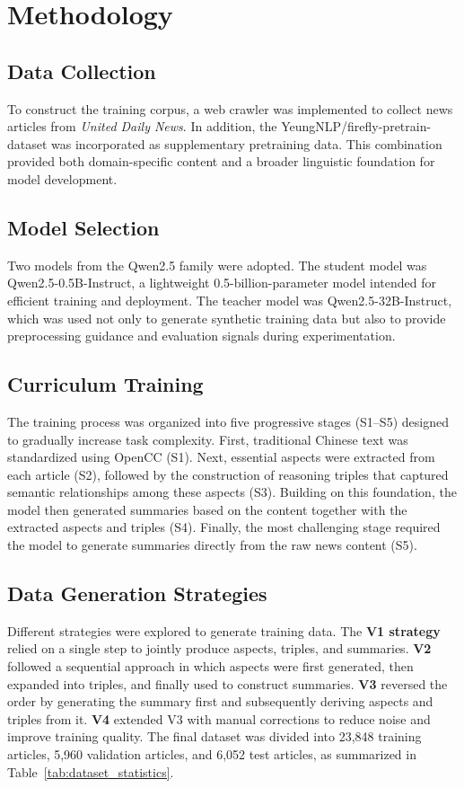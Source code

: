 
\chapter{Methodology}
\section{Data Collection}
To construct the training corpus, a web crawler was implemented to collect news articles from \textit{United Daily News}. In addition, the YeungNLP/firefly-pretrain-dataset was incorporated as supplementary pretraining data. This combination provided both domain-specific content and a broader linguistic foundation for model development.

\section{Model Selection}
Two models from the Qwen2.5 family were adopted. The student model was Qwen2.5-0.5B-Instruct, a lightweight 0.5-billion-parameter model intended for efficient training and deployment. The teacher model was Qwen2.5-32B-Instruct, which was used not only to generate synthetic training data but also to provide preprocessing guidance and evaluation signals during experimentation.

\section{Curriculum Training}
The training process was organized into five progressive stages (S1–S5) designed to gradually increase task complexity. First, traditional Chinese text was standardized using OpenCC (S1). Next, essential aspects were extracted from each article (S2), followed by the construction of reasoning triples that captured semantic relationships among these aspects (S3). Building on this foundation, the model then generated summaries based on the content together with the extracted aspects and triples (S4). Finally, the most challenging stage required the model to generate summaries directly from the raw news content (S5).

\section{Data Generation Strategies}
Different strategies were explored to generate training data. The \textbf{V1 strategy} relied on a single step to jointly produce aspects, triples, and summaries. \textbf{V2} followed a sequential approach in which aspects were first generated, then expanded into triples, and finally used to construct summaries. \textbf{V3} reversed the order by generating the summary first and subsequently deriving aspects and triples from it. \textbf{V4} extended V3 with manual corrections to reduce noise and improve training quality. The final dataset was divided into 23,848 training articles, 5,960 validation articles, and 6,052 test articles, as summarized in Table~\ref{tab:dataset_statistics}.

